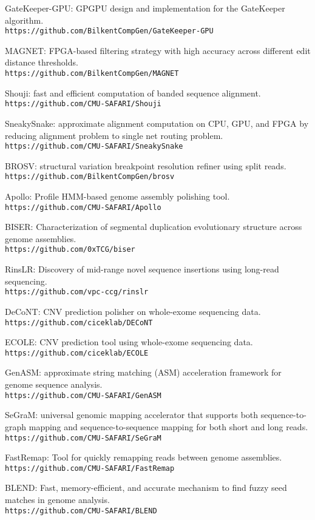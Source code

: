 \begin{list2}
  
  \item
  GateKeeper-GPU: GPGPU design and implementation for the GateKeeper algorithm.\\
  {\tt https://github.com/BilkentCompGen/GateKeeper-GPU}

\item
  MAGNET: FPGA-based filtering strategy with high accuracy across different edit distance thresholds.\\
  {\tt https://github.com/BilkentCompGen/MAGNET}
  
\item
  Shouji: fast and efficient computation of banded sequence alignment.\\
  {\tt https://github.com/CMU-SAFARI/Shouji}
\item
  SneakySnake: approximate alignment computation on CPU, GPU, and FPGA by reducing alignment problem to single net routing problem.\\
  {\tt https://github.com/CMU-SAFARI/SneakySnake}
\item
  BROSV: structural variation breakpoint resolution refiner using split reads.\\
  {\tt https://github.com/BilkentCompGen/brosv}
  \item
  Apollo: Profile HMM-based genome assembly polishing tool.\\
  {\tt https://github.com/CMU-SAFARI/Apollo}
  \item
  BISER: Characterization of segmental duplication evolutionary structure across genome assemblies.\\
  {\tt https://github.com/0xTCG/biser}
  \item
  RinsLR: Discovery of mid-range novel sequence insertions using long-read sequencing.\\
  {\tt https://github.com/vpc-ccg/rinslr}
  \item
DeCoNT: CNV prediction polisher on whole-exome sequencing data.\\
{\tt https://github.com/ciceklab/DECoNT}
  \item
ECOLE: CNV prediction tool using whole-exome sequencing data.\\
{\tt https://github.com/ciceklab/ECOLE}

  \item
GenASM: approximate string matching (ASM) acceleration framework for genome sequence analysis.\\
  {\tt https://github.com/CMU-SAFARI/GenASM}
  
  \item
  SeGraM: universal genomic mapping accelerator that supports both sequence-to-graph mapping and sequence-to-sequence mapping for both short and long reads.\\
{\tt https://github.com/CMU-SAFARI/SeGraM}
  \item
FastRemap: Tool for quickly remapping reads between genome assemblies.\\
{\tt https://github.com/CMU-SAFARI/FastRemap}
  \item
BLEND: Fast, memory-efficient, and accurate mechanism to find fuzzy seed matches in genome analysis.\\
{\tt https://github.com/CMU-SAFARI/BLEND}


\end{list2}
